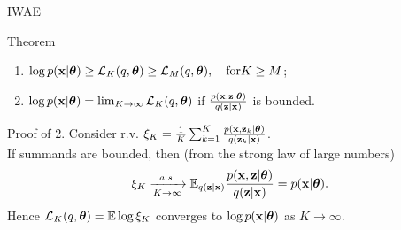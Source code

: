 \documentclass{beamer}
\begin{document}
\begin{frame}{IWAE}
	\begin{block}{Theorem}
		\begin{enumerate}
			\item $\log p(\mathbf{x} | \boldsymbol{\theta}) \geq \mathcal{L}_K (q, \boldsymbol{\theta}) \geq \mathcal{L}_M (q, \boldsymbol{\theta}), \quad \text{for} K \geq M$;
			\item $\log p(\mathbf{x} | \boldsymbol{\theta}) = \lim_{K \rightarrow \infty} \mathcal{L}_K (q, \boldsymbol{\theta})$ if $\frac{p(\mathbf{x}, \mathbf{z} | \boldsymbol{\theta})}{q(\mathbf{z} | \mathbf{x})}$ is bounded.
		\end{enumerate}
		\vspace{-0.2cm}
	\end{block}
	\begin{block}{Proof of 2.}
		\vspace{0.2cm}
		Consider r.v. $\xi_K = \frac{1}{K}\sum_{k=1}^K \frac{p(\mathbf{x}, \mathbf{z}_k | \boldsymbol{\theta})}{q(\mathbf{z}_k | \mathbf{x})}$. \\
		\vspace{0.2cm}
		If summands are bounded, then (from the strong law of large numbers)
		\[
		\xi_K \xrightarrow[K \rightarrow \infty]{a.s.} \mathbb{E}_{q(\mathbf{z} | \mathbf{x})} \frac{p(\mathbf{x}, \mathbf{z} | \boldsymbol{\theta})}{q(\mathbf{z} | \mathbf{x})} = p(\mathbf{x} | \boldsymbol{\theta}).
		\]
		Hence $\mathcal{L}_K (q, \boldsymbol{\theta}) = \mathbb{E} \log \xi_K$ converges to $\log p(\mathbf{x} | \boldsymbol{\theta})$ as $K \rightarrow \infty$.
	\end{block}

\end{frame}
\end{document}
